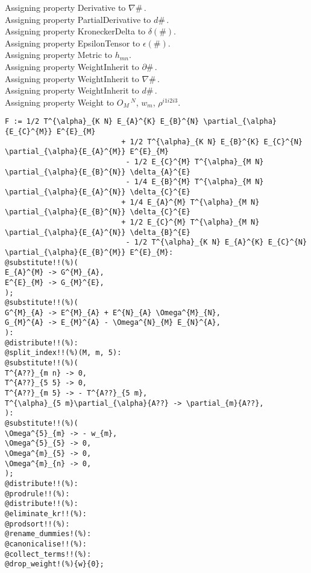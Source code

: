 \documentclass[11pt]{article}
\begin{document}
Assigning property Derivative to $\nabla{\#}\, $.
\\
Assigning property PartialDerivative to $d{\#}\, $.
\\
Assigning property KroneckerDelta to $\delta(\#)$.
\\
Assigning property EpsilonTensor to $\epsilon(\#)$.
\\
Assigning property Metric to ${h}_{m n}$.
\\
Assigning property WeightInherit to $\partial{\#}\, $.
\\
Assigning property WeightInherit to $\nabla{\#}\, $.
\\
Assigning property WeightInherit to $d{\#}\, $.
\\
Assigning property Weight to ${O}_{M}\,^{N}$, ${w}_{m}$, ${\rho}^{i1 i2 i3}$.
\\
{\color[named]{Blue}\begin{verbatim}
F := 1/2 T^{\alpha}_{K N} E_{A}^{K} E_{B}^{N} \partial_{\alpha}{E_{C}^{M}} E^{E}_{M}
                           + 1/2 T^{\alpha}_{K N} E_{B}^{K} E_{C}^{N} \partial_{\alpha}{E_{A}^{M}} E^{E}_{M}
                            - 1/2 E_{C}^{M} T^{\alpha}_{M N} \partial_{\alpha}{E_{B}^{N}} \delta_{A}^{E}
                            - 1/4 E_{B}^{M} T^{\alpha}_{M N} \partial_{\alpha}{E_{A}^{N}} \delta_{C}^{E}
                           + 1/4 E_{A}^{M} T^{\alpha}_{M N} \partial_{\alpha}{E_{B}^{N}} \delta_{C}^{E}
                           + 1/2 E_{C}^{M} T^{\alpha}_{M N} \partial_{\alpha}{E_{A}^{N}} \delta_{B}^{E}
                            - 1/2 T^{\alpha}_{K N} E_{A}^{K} E_{C}^{N} \partial_{\alpha}{E_{B}^{M}} E^{E}_{M}:
@substitute!!(%)(
E_{A}^{M} -> G^{M}_{A},
E^{E}_{M} -> G_{M}^{E},
);
@substitute!!(%)(
G^{M}_{A} -> E^{M}_{A} + E^{N}_{A} \Omega^{M}_{N},
G_{M}^{A} -> E_{M}^{A} - \Omega^{N}_{M} E_{N}^{A},
):
@distribute!!(%):
@split_index!!(%)(M, m, 5):
@substitute!!(%)(
T^{A??}_{m n} -> 0,
T^{A??}_{5 5} -> 0,
T^{A??}_{m 5} -> - T^{A??}_{5 m},
T^{\alpha}_{5 m}\partial_{\alpha}{A??} -> \partial_{m}{A??},
):
@substitute!!(%)(
\Omega^{5}_{m} -> - w_{m},
\Omega^{5}_{5} -> 0,
\Omega^{m}_{5} -> 0,
\Omega^{m}_{n} -> 0,
);
@distribute!!(%):
@prodrule!!(%):
@distribute!!(%):
@eliminate_kr!!(%):
@prodsort!!(%):
@rename_dummies!(%):
@canonicalise!!(%):
@collect_terms!!(%):
@drop_weight!(%){w}{0};
\end{verbatim}}
\end{document}
